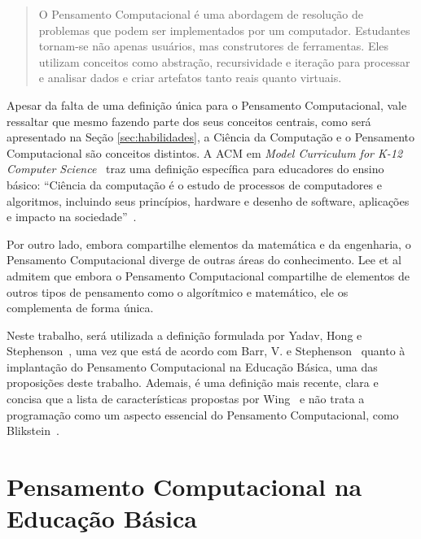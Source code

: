\begin{quote}
O Pensamento Computacional é uma abordagem de resolução de problemas que podem ser implementados por um computador. Estudantes tornam-se não apenas usuários, mas construtores de ferramentas. Eles utilizam conceitos como abstração, recursividade e iteração para processar e analisar dados e criar artefatos tanto reais quanto virtuais. ~\cite[~p.51, tradução das autoras]{barr_bringing_2011}
\end{quote}

Apesar da falta de uma definição única para o Pensamento Computacional, vale ressaltar que mesmo fazendo parte dos seus conceitos centrais, como será apresentado na Seção \ref{sec:habilidades}, a Ciência da Computação e o Pensamento Computacional são conceitos distintos. A \acrshort{ACM} em \textit{Model Curriculum for K-12 Computer Science}~\cite{tucker_model_2003} traz uma definição específica para educadores do ensino básico: “Ciência da computação é o estudo de processos de computadores e algoritmos, incluindo seus princípios, hardware e desenho de software, aplicações e impacto na sociedade”~\cite[~p.6, tradução das autoras]{tucker_model_2003}. 

Por outro lado, embora compartilhe elementos da matemática e da engenharia, o Pensamento Computacional diverge de outras áreas do conhecimento. Lee et al~\cite{lee_computational_2011} admitem que embora o Pensamento Computacional compartilhe de elementos de outros tipos de pensamento como o algorítmico e matemático, ele os complementa de forma única. 

Neste trabalho, será utilizada a definição formulada por Yadav, Hong e Stephenson~\cite{yadav_computational_2016}, uma vez que está de acordo com Barr, V. e Stephenson~\cite{barr_bringing_2011} quanto à implantação do Pensamento Computacional na Educação Básica, uma das proposições deste trabalho. Ademais, é uma definição mais recente, clara e concisa que a lista de características propostas por Wing~\cite{wing_computational_2006} e não trata a programação como um aspecto essencial do Pensamento Computacional, como Blikstein~\cite{blikstein_o_2008}.

\section{Pensamento Computacional na Educação Básica}\label{sec:pc_educacao_basica}


